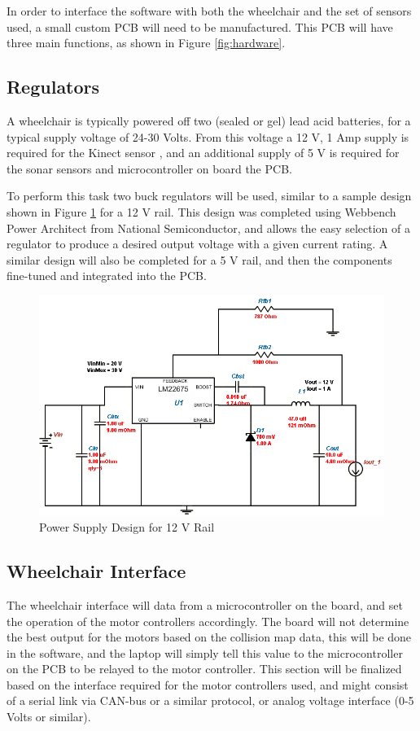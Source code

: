 \documentclass[oneside,final,a4paper]{report}
\begin{document}
In order to interface the software with both the wheelchair and the set of sensors used, a small custom PCB will need to be manufactured. This PCB will have three main functions, as shown in Figure \ref{fig:hardware}.

\subsection{Regulators}
A wheelchair is typically powered off two (sealed or gel) lead acid batteries, for a typical supply voltage of 24-30 Volts. From this voltage a 12 V, 1 Amp supply is required for the Kinect sensor \cite{kinect_power}, and an additional supply of 5 V is required for the sonar sensors and microcontroller on board the PCB.

To perform this task two buck regulators will be used, similar to a sample design shown in Figure \ref{fig:webbench} for a 12 V rail. This design was completed using Webbench Power Architect from National Semiconductor, and allows the easy selection of a regulator to produce a desired output voltage with a given current rating. A similar design will also be completed for a 5 V rail, and then the components fine-tuned and integrated into the PCB.

\begin{figure}[hbt]
 \centering
 \includegraphics[scale=0.5]{Power_Supply}
 \caption{Power Supply Design for 12 V Rail}\label{fig:webbench}
\end{figure}

\subsection{Wheelchair Interface}
The wheelchair interface will data from a microcontroller on the board, and set the operation of the motor controllers accordingly. The board will not determine the best output for the motors based on the collision map data, this will be done in the software, and the laptop will simply tell this value to the microcontroller on the PCB to be relayed to the motor controller. This section will be finalized based on the interface required for the motor controllers used, and might consist of a serial link via  CAN-bus or a similar protocol, or analog voltage interface (0-5 Volts or similar).
\end{document}

